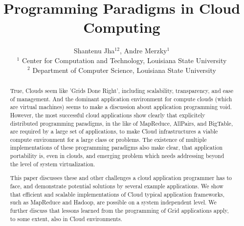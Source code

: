 \documentclass{article}
\begin{document}
\title{\large Programming Paradigms in Cloud Computing}

\author{Shantenu Jha$^{12}$,
        Andre Merzky$^1$\\[1em]
        $^1$\small
          Center for Computation and Technology, 
          Louisiana State University\\
        $^2$ \small
          Department of Computer Science, 
          Louisiana State University
       }

\maketitle

\begin{abstract}

  True, Clouds seem like 'Grids Done Right', including scalability,
  transparency, and ease of management.  And the dominant application
  environment for compute clouds (which are virtual machines) seems to
  make a discussion about application programming void.  However, the
  most successful cloud applications show clearly that explicitely
  distributed programming paradigms, in the like of MapReduce,
  AllPairs, and BigTable, are required by a large set of applications,
  to make Cloud infrastructures a viable compute environment for a
  large class or problems.  The existence of multiple implementations
  of these programming paradigms also make clear, that application
  portability is, even in clouds, and emerging problem which needs
  addressing beyond the level of system virtualization.

  This paper discusses these and other challenges a cloud application
  programmer has to face, and demonstrate potential solutions by
  several example applications.  We show that efficient and scalable
  implementations of Cloud typical application frameworks, such as
  MapReduce and Hadoop, are possible on a system independent level.
  We further discuss that lessons learned from the programming of Grid
  applications apply, to some extent, also in Cloud environments.

\end{abstract}



\newpage
\end{document}
